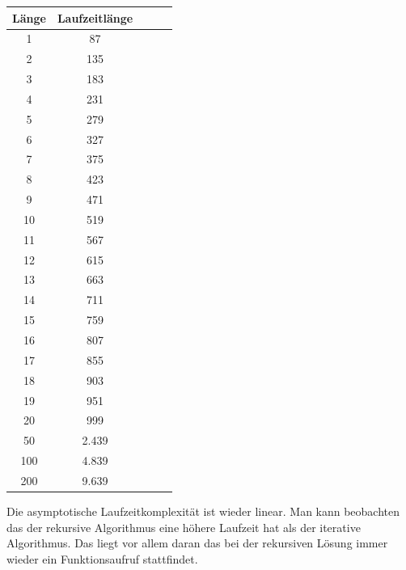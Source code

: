 \begin{center}
\begin{tabular}{|c|c|c|c|c|}
\hline
Länge    & Laufzeitlänge \\ \hline 
1     & 87 	\\ \hline 
2     & 135 	\\ \hline 
3     & 183 	\\ \hline 
4     & 231 	\\ \hline 
5     & 279 	\\ \hline 
6     & 327 	\\ \hline 
7     & 375 	\\ \hline 
8     & 423 	\\ \hline 
9     & 471 	\\ \hline 
10    & 519 	\\ \hline 
11    & 567 	\\ \hline 
12    & 615 	\\ \hline 
13    & 663 	\\ \hline 
14    & 711 	\\ \hline 
15    & 759 	\\ \hline 
16    & 807 	\\ \hline 
17    & 855 	\\ \hline 
18    & 903 	\\ \hline 
19    & 951 	\\ \hline 
20    & 999	    \\ \hline 
50    & 2.439	\\ \hline 
100   & 4.839	\\ \hline 
200	  & 9.639	\\ \hline 

\end{tabular}
\end{center}

\raggedright

Die asymptotische Laufzeitkomplexität ist wieder linear. Man kann beobachten das der rekursive Algorithmus eine höhere Laufzeit hat als der iterative Algorithmus. Das liegt vor allem daran das bei der rekursiven Lösung immer wieder ein Funktionsaufruf stattfindet.